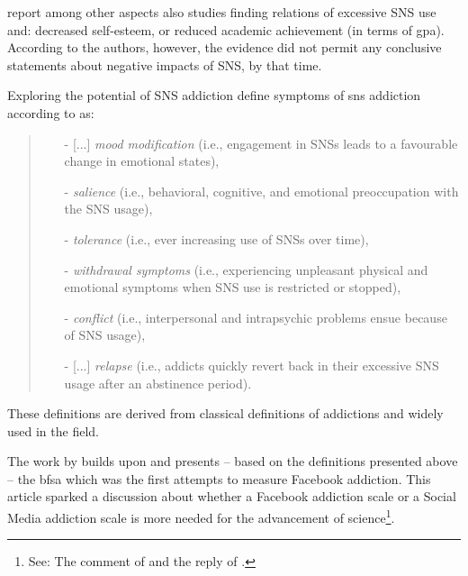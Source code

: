 \citet{kuss_online_2011} report among other aspects also studies finding relations of excessive SNS use and: decreased self-esteem, or reduced academic achievement (in terms of \gls{gpa}).
According to the authors, however, the evidence did not permit any conclusive statements about negative impacts of SNS, by that time.

Exploring the potential of SNS addiction \citeauthor{kuss_online_2011} define symptoms of \gls{sns} addiction according to \citep{griffiths_components_2005} as:
\begin{quote}
\begin{itemize}
    \item [-] [...] \textit{mood modification} (i.e., engagement in SNSs leads to a favourable change in emotional states),
    \item [-] \textit{salience} (i.e., behavioral, cognitive, and emotional preoccupation with the SNS usage),
    \item [-] \textit{tolerance} (i.e., ever increasing use of SNSs over time),
    \item [-] \textit{withdrawal symptoms} (i.e., experiencing unpleasant physical and emotional symptoms when SNS use is restricted or stopped),
    \item [-] \textit{conflict} (i.e., interpersonal and intrapsychic problems ensue because of SNS usage),
    \item [-] [...] \textit{relapse} (i.e., addicts quickly revert back in their excessive SNS usage after an abstinence period).
\end{itemize}
\end{quote}
\citep[p 3530][itemisation and emphasis added]{kuss_online_2011} 

These definitions are derived from classical definitions of addictions and widely used in the field.

The work by \citet{andreassen_development_2012} builds upon \citep{young_internet_1998, griffiths_components_2005, kuss_online_2011} and presents -- based on the definitions presented above -- the \gls{bfsa} which was the first attempts to measure Facebook addiction.
This article sparked a discussion about whether a Facebook addiction scale or a Social Media addiction scale is more needed for the advancement of science\footnote{See: The comment of \citet{griffiths_facebook_2012} and the reply of \citet{andreassen_facebook_2013}.}. 

